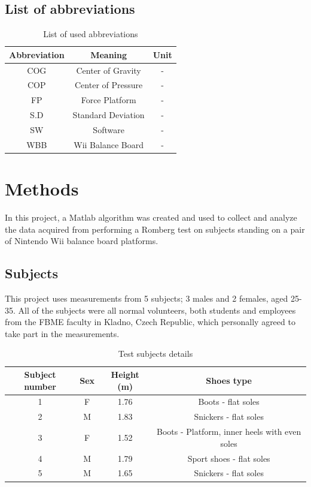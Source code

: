 \documentclass[twoside]{ctuthesis}
\theoremstyle{plain}
\theoremstyle{definition}
\theoremstyle{note}
\begin{document}
\section{List of abbreviations}
\begin{table}[H]
	\centering
	\begin{tabular}{|c|c|c|}
		\hline
		Abbreviation & Meaning & Unit \\ \hline
		COG & Center of Gravity & -\\
		COP & Center of Pressure & -\\
		FP & Force Platform & -\\
		S.D & Standard Deviation & -\\
		SW & Software & -\\
		WBB & Wii Balance Board & -\\
		\hline
	\end{tabular}
	\caption{List of used abbreviations}
\end{table}

\pagebreak

\begingroup
\renewcommand{\cleardoublepage}{}
\renewcommand{\clearpage}{}
\chapter{Methods}
\endgroup

In this project, a Matlab algorithm was created and used to collect and analyze the data acquired from performing a Romberg test on subjects standing on a pair of Nintendo Wii balance board platforms. 

\section*{Subjects}
This project uses measurements from 5 subjects; 3 males and 2 females, aged 25-35. All of the subjects were all normal volunteers, both students and employees from the FBME faculty in Kladno, Czech Republic, which personally agreed to take part in the measurements.

\begin{table}[H]
	\centering
	\begin{tabular}{| c |c|c| c|}
		\hline
		Subject number & Sex & Height (m) & Shoes type\\ \hline
		1 & F & 1.76 & Boots - flat soles\\
		2 & M & 1.83 & Snickers - flat soles\\
		3 & F & 1.52 & Boots - Platform, inner heels with even soles\\
		4 & M & 1.79 & Sport shoes - flat soles\\
		5 & M & 1.65 & Snickers - flat soles\\
		\hline
	\end{tabular}
	\caption{Test subjects details}
\end{table}
\end{document}
